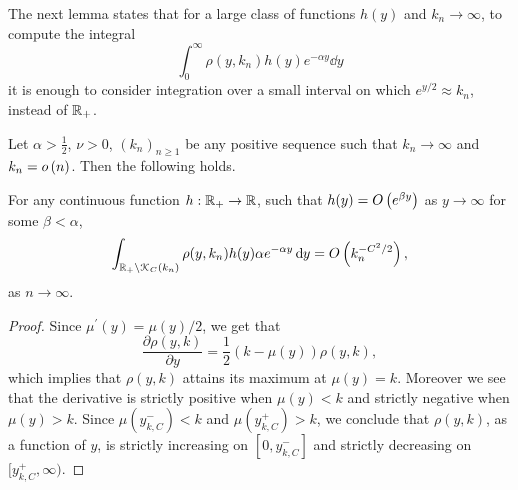 \begin{appendices}
The next lemma states that for a large class of functions $h(y)$ and $k_n \to \infty$, to compute the integral 
\[
	\int_{0}^\infty \rho(y,k_n) h(y) e^{-\alpha y} \dd y
\]
it is enough to consider integration over a small interval on which $e^{y/2} \approx k_n$, instead of ${\mathbb R}_+$. 

\begin{lemma}\label{lem:concentration_argument}
Let $\alpha > \frac{1}{2}$, $\nu > 0$, $(k_n)_{n \ge 1}$ be any positive sequence such that $k_n \to \infty$ and $k_n = o\left(n\right)$. Then the following holds.

For any continuous function $h : {\mathbb R}_+ \rightarrow  {\ensuremath{\mathbb R}}$, such that $h(y) = O\left(e^{\beta y}\right)$ as $y \to \infty$ for some $\beta < \alpha$, 
\begin{equation}\label{eq:error_bound_int_rho_not_K}
	\int_{{\mathbb R}_+ \setminus {\mathcal K}_C(k_n)} \rho(y,k_n) h(y) \alpha e^{-\alpha y} \operatorname{\mathrm{d}\hspace{-2pt}} y
	= O\left(k_n^{-C^2/2}\right),
\end{equation}
as $n \to \infty$.
\end{lemma}

\begin{proof}
Since $\mu^\prime(y) = \mu(y)/2$, we get that
\[
	\frac{\partial \rho(y,k)}{\partial y} = \frac{1}{2}\left(k - \mu(y)\right)\rho(y,k),
\]
which implies that $\rho(y,k)$ attains its maximum at $\mu(y) = k$. Moreover we see that the derivative is strictly positive when $\mu(y) < k$ and strictly negative when $\mu(y) > k$. Since $\mu(y_{k,C}^-) < k$ and $\mu(y_{k,C}^+) > k$, we conclude that $\rho(y,k)$, as a function of $y$, is strictly increasing on $[0,y_{k,C}^-]$ and strictly decreasing on $[y_{k,C}^+,\infty)$.


\end{proof}
\end{appendices}
